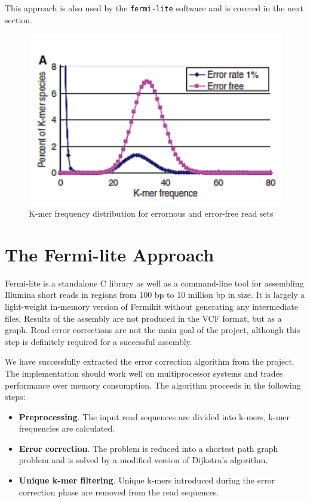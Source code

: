 This approach is also used by the \texttt{fermi-lite}\cite{fermi-lite} software and is covered in the next section.

\begin{figure}[h]
	\centering
	\includegraphics{img/kmer-frequency-distribution.pdf}
	\caption{K-mer frequency distribution for errornous and error-free read sets\cite{alg-compare}}
	\label{fig:kmer-frequency-distribution}
\end{figure}

\section{The Fermi-lite Approach}
\label{sec:fermi-lite}

Fermi-lite is a standalone C library as well as a command-line tool for assembling Illumina short reads in regions from 100 bp to 10 million bp in size. It is largely a light-weight in-memory version of Fermikit\cite{fermikit} without generating any intermediate files\cite{fermi-lite}. Results of the assembly are not produced in the VCF format, but as a graph. Read error corrections are not the main goal of the project, although this step is definitely required for a successful assembly.

We have successfully extracted the error correction algorithm from the project. The implementation should work well on multiprocessor systems and trades performance over memory consumption. The algorithm proceeds in the following steps:
\begin{itemize}
\item \textbf{Preprocessing}. The input read sequences are divided into k-mers, k-mer frequencies are calculated.
\item \textbf{Error correction}. The problem is reduced into a shortest path graph problem and is solved by a modified version of Dijkstra's algorithm.
\item \textbf{Unique k-mer filtering}. Unique k-mers introduced during the error correction phase are removed from the read sequences.
\end{itemize}
 
